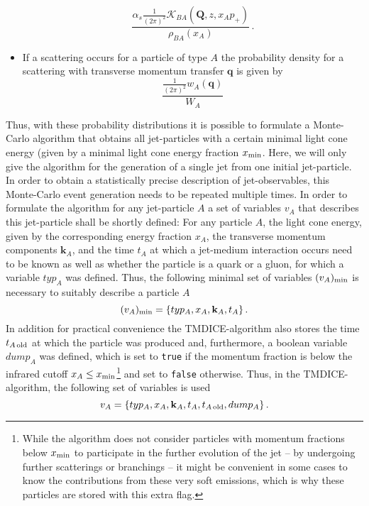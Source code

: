 \documentclass[preprint,12pt]{elsarticle}
\newcommand{\tmdice}{{\sf TMDICE}}
\begin{document}
\begin{itemize}
    \begin{equation}
        \frac{\alpha_s  \frac{1}{(2\pi)^2}\mathcal{K}_{BA}(\mathbf{Q},z,x_Ap_+)}{\rho_{BA}(x_A)}\,.
        \label{eq:splitxq}
    \end{equation}
    \item If a scattering occurs for a particle of type $A$ the probability density for a scattering with transverse momentum transfer $\mathbf{q}$ is given by 
    \begin{equation}
        \frac{\frac{1}{(2\pi)^2} w_A(\mathbf{q})}{W_A}
        \label{eq:scatq}
    \end{equation}
\end{itemize}
Thus, with these probability distributions it is possible to formulate a Monte-Carlo algorithm that obtains all jet-particles with a certain minimal light cone energy (given by a minimal light cone energy fraction $x_{\rm min}$.
Here, we will only give the algorithm for the generation of a single jet from one initial jet-particle.
In order to obtain a statistically precise description of jet-observables, this Monte-Carlo event generation needs to be repeated multiple times.
In order to formulate the algorithm for any jet-particle $A$ a set of variables $v_A$ that describes this jet-particle shall be shortly defined:
For any particle $A$, the light cone energy, given by the corresponding energy fraction $x_A$, the transverse momentum components $\mathbf{k}_A$, and the time $t_A$ at which a jet-medium interaction occurs need to be known as well as whether the particle is a quark or a gluon, for which a variable $typ_A$ was defined. 
Thus, the following minimal set of variables $(v_A)_{\rm min}$ is necessary to suitably describe a particle $A$
\begin{equation}
    (v_A)_{\rm min}=\{typ_A, x_A, \mathbf{k}_A, t_A\}\,.
\end{equation}
In addition for practical convenience the \tmdice-algorithm also stores the time $t_{A\,{\rm old}}$ at which the particle was produced and, furthermore, a boolean variable $dump_A$ was defined, which is set to \verb#true# if the momentum fraction is below the infrared cutoff $x_A\leq x_{\rm min}$\footnote{While the algorithm does not consider particles with momentum fractions below $x_{\rm min}$ to participate in the further evolution of the jet -- by undergoing further scatterings or branchings -- it might be convenient in some cases to know the contributions from these very soft emissions, which is why these particles are stored with this extra flag.} and set to \verb#false# otherwise. 
Thus, in the \tmdice-algorithm, the following set of variables is used
\begin{equation}
    v_A=\{typ_A, x_A, \mathbf{k}_A, t_A,t_{A\,{\rm old}},dump_A\}\,.
\end{equation}
\end{document}
